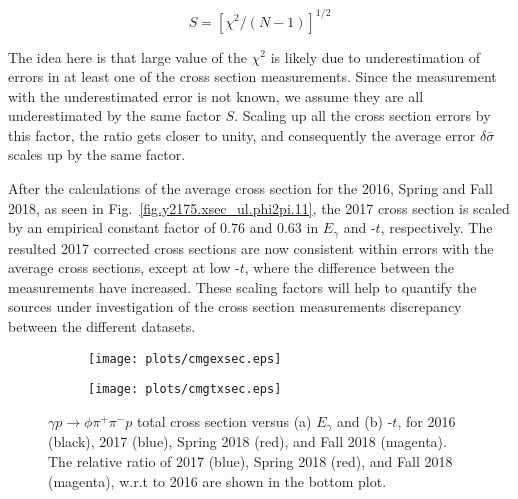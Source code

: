 \begin{equation}
    \label{eq.y2175.xsec_ul.phi2pi.4}
    S = [\chi^{2}/(N-1)]^{1/2}
\end{equation}

The idea here is that large value of the $\chi^{2}$ is likely due to underestimation of errors in at least one of the cross section measurements. Since the measurement with the underestimated error is not known, we assume they are all underestimated by the same factor $S$. Scaling up all the cross section errors by this factor, the ratio gets closer to unity, and consequently the average error $\delta\bar{\sigma}$ scales up by the same factor.
~\par After the calculations of the average cross section for the 2016, Spring and Fall 2018, as seen in Fig.~\ref{fig.y2175.xsec_ul.phi2pi.11}, the 2017 cross section is scaled by an empirical constant factor of $0.76$ and $0.63$ in $E_{\gamma}$ and -$t$, respectively. The resulted 2017 corrected cross sections are now consistent within errors with the average cross sections, except at low -$t$, where the difference between the measurements have increased. These scaling factors will help to quantify the sources under investigation of the cross section measurements discrepancy between the different datasets.

\begin{center}
\null
\vfill
\begin{figure}[H]
    \centering
    \begin{subfigure}[b]{0.5\textwidth}
        \texttt{[image: plots/cmgexsec.eps]}
        \caption{}
        \label{fig.y2175.xsec_ul.phi2pi.10.a}
    \end{subfigure}\hfill
    \begin{subfigure}[b]{0.5\textwidth}
        \texttt{[image: plots/cmgtxsec.eps]}
        \caption{}
        \label{fig.y2175.xsec_ul.phi2pi.10.b}
    \end{subfigure}
    \caption{\label{fig.y2175.xsec_ul.phi2pi.10}$\gamma p \rightarrow \phi \pi^{+} \pi^{-} p$ total cross section versus (a) $E_{\gamma}$ and (b) -$t$, for 2016 (black), 2017 (blue), Spring 2018 (red), and Fall 2018 (magenta). The relative ratio of 2017 (blue), Spring 2018 (red), and Fall 2018 (magenta), w.r.t to 2016 are shown in the bottom plot.}
\end{figure}
\null
\vfill
\end{center}

